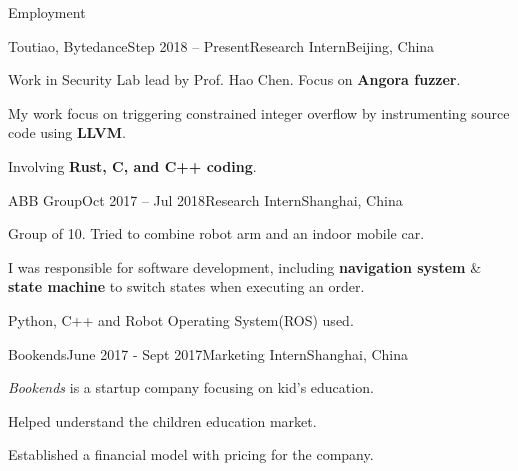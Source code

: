 \documentclass{resume} %
\begin{document}
\begin{rSection}{Employment}

\begin{rSubsection}
  {Toutiao, Bytedance}{Step 2018 – Present}{Research Intern}{Beijing, China}
    \item Work in Security Lab lead by Prof. Hao Chen. Focus on \textbf{Angora fuzzer}.
    \item My work focus on triggering constrained integer overflow by instrumenting source code using \textbf{LLVM}.
    \item Involving \textbf{Rust, C, and C++ coding}.
\end{rSubsection}


\begin{rSubsection}
  {ABB Group}{Oct 2017 – Jul 2018}{Research Intern}{Shanghai, China}
    \item Group of 10. Tried to combine robot arm and an indoor mobile car.
    \item I was responsible for software development, including \textbf{navigation system} \& \textbf{state machine} to switch states when executing an order.
    \item Python, C++ and Robot Operating System(ROS) used.
\end{rSubsection}


\begin{rSubsection}
  {Bookends}{June 2017 - Sept 2017}{Marketing Intern}{Shanghai, China}
    \item \textit{Bookends} is a startup company focusing on kid's education.
    \item Helped understand the children education market.
    \item Established a financial model with pricing for the company.
\end{rSubsection}

\end{rSection}
\end{document}
